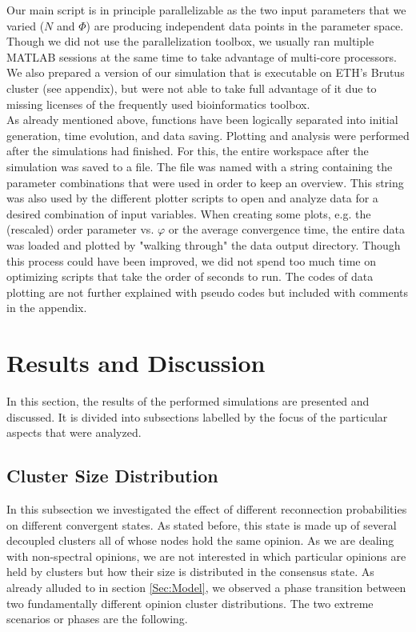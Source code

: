 \documentclass[11pt]{article}
\begin{document}
Our main script is in principle parallelizable as the two input parameters that we varied ($N$ and $\Phi$) are producing independent data points in the parameter space. Though we did not use the parallelization toolbox, we usually ran multiple MATLAB sessions at the same time to take advantage of multi-core processors. We also prepared a version of our simulation that is executable on ETH's Brutus cluster (see appendix), but were not able to take full advantage of it due to missing licenses of the frequently used bioinformatics toolbox. \\

As already mentioned above, functions have been logically separated into initial generation, time evolution, and data saving. Plotting and analysis were performed after the simulations had finished. For this, the entire workspace after the simulation was saved to a file. The file was named with a string containing the parameter combinations that were used in order to keep an overview. This string was also used by the different plotter scripts to open and analyze data for a desired combination of input variables. When creating some plots, e.g. the (rescaled) order parameter vs. $\varphi$ or the average convergence time, the entire data was loaded and plotted by "walking through" the data output directory. Though this process could have been improved, we did not spend too much time on optimizing scripts that take  the order of seconds to run. The codes of data plotting are not further explained with pseudo codes but included with comments in the appendix.





\section{Results and Discussion}

In this section, the results of the performed simulations are presented and discussed. It is divided into subsections labelled by the focus of the particular aspects that were analyzed.


\subsection{Cluster Size Distribution}
\label{Sec:cluster_distr}

In this subsection we investigated the effect of different reconnection probabilities on different convergent states. As stated before, this state is made up of several decoupled clusters all of whose nodes hold the same opinion. As we are dealing with non-spectral opinions, we are not interested in which particular opinions are held by clusters but how their size is distributed in the consensus state. As already alluded to in section \ref{Sec:Model}, we observed a phase transition between two fundamentally different opinion cluster distributions. The two extreme scenarios or phases are the following.\\
\end{document}
